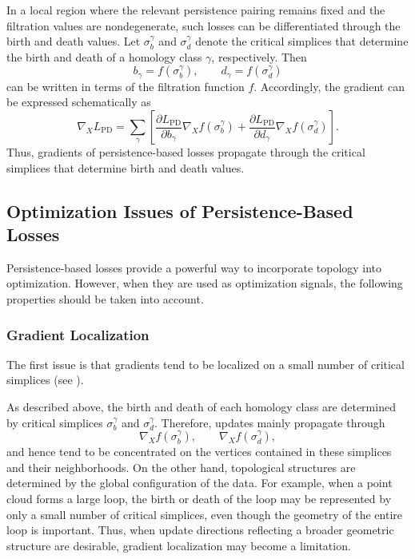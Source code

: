 \documentclass[pdflatex,sn-mathphys-num]{sn-jnl}%
\theoremstyle{thmstyleone}%
\theoremstyle{thmstyletwo}%
\theoremstyle{thmstylethree}%
\begin{document}
In a local region where the relevant persistence pairing remains fixed and the filtration values are nondegenerate, such losses can be differentiated through the birth and death values.
Let \(\sigma_b^\gamma\) and \(\sigma_d^\gamma\) denote the critical simplices that determine the birth and death of a homology class \(\gamma\), respectively.
Then
\[
b_\gamma=f(\sigma_b^\gamma),
\qquad
d_\gamma=f(\sigma_d^\gamma)
\]
can be written in terms of the filtration function \(f\).
Accordingly, the gradient can be expressed schematically as
\[
\nabla_X L_{\mathrm{PD}}
=
\sum_\gamma
\left[
\frac{\partial L_{\mathrm{PD}}}{\partial b_\gamma}
\nabla_Xf(\sigma_b^\gamma)
+
\frac{\partial L_{\mathrm{PD}}}{\partial d_\gamma}
\nabla_Xf(\sigma_d^\gamma)
\right].
\]
Thus, gradients of persistence-based losses propagate through the critical simplices that determine birth and death values.

\subsection{Optimization Issues of Persistence-Based Losses}

Persistence-based losses provide a powerful way to incorporate topology into optimization.
However, when they are used as optimization signals, the following properties should be taken into account.

\subsubsection{Gradient Localization}

The first issue is that gradients tend to be localized on a small number of critical simplices
(see \cite{nigmetov2024topological,nigmetov2024topological_2}).

As described above, the birth and death of each homology class are determined by critical simplices
\(\sigma_b^\gamma\) and \(\sigma_d^\gamma\).
Therefore, updates mainly propagate through
\[
\nabla_Xf(\sigma_b^\gamma),
\qquad
\nabla_Xf(\sigma_d^\gamma),
\]
and hence tend to be concentrated on the vertices contained in these simplices and their neighborhoods.
On the other hand, topological structures are determined by the global configuration of the data.
For example, when a point cloud forms a large loop, the birth or death of the loop may be represented by only a small number of critical simplices, even though the geometry of the entire loop is important.
Thus, when update directions reflecting a broader geometric structure are desirable, gradient localization may become a limitation.
\end{document}
